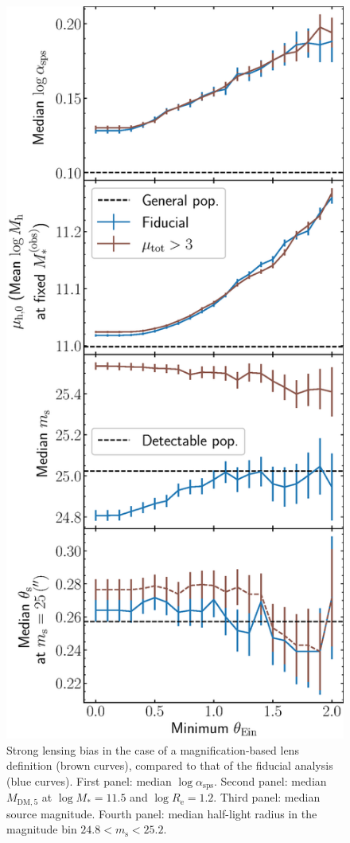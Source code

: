 \documentclass{aa}
\def\reff{R_{\mathrm{e}}}
\def\mstar{M_*}
\def\asps{\alpha_{\mathrm{sps}}}
\def\msource{m_{\mathrm{s}}}
\def\mdmfive{M_{\mathrm{DM}, 5}}
\begin{document}
{\begin{figure}
\includegraphics[width=\columnwidth]{minmu_bias.eps}
\caption{
Strong lensing bias in the case of a magnification-based lens definition (brown curves), compared to that of the fiducial analysis (blue curves).
First panel: median $\log{\asps}$.
Second panel: median $\mdmfive$ at $\log{\mstar}=11.5$ and $\log{\reff}=1.2$.
Third panel: median source magnitude.
Fourth panel: median half-light radius in the magnitude bin $24.8 < \msource < 25.2$.
}
\label{fig:minmubias}
\end{figure}
}
\end{document}
